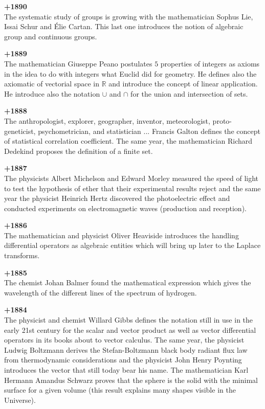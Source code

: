 \textbf{+1890}\\
The systematic study of groups is growing with the mathematician Sophus Lie, Issai Schur and Élie Cartan. This last one introduces the notion of algebraic group and continuous groups. 

\textbf{+1889}\\
The mathematician Giuseppe Peano postulates $5$ properties of integers as axioms in the idea to do with integers what Euclid did for geometry. He defines also the axiomatic of vectorial space in $\mathbb{R}$ and introduce the concept of linear application. He introduce also the notation $\cup$ and $\cap$ for the union and intersection of sets.

\textbf{+1888}\\
The anthropologist, explorer, geographer, inventor, meteorologist, proto-geneticist, psychometrician, and statistician ... Francis Galton defines the concept of statistical correlation coefficient. The same year, the mathematician Richard Dedekind proposes the definition of a finite set. 

\textbf{+1887}\\
The physicists Albert Michelson and Edward Morley measured the speed of light to test the hypothesis of ether that their experimental results reject and the same year the physicist Heinrich Hertz discovered the photoelectric effect and conducted experiments on electromagnetic waves (production and reception).

\textbf{+1886}\\
The mathematician and physicist Oliver Heaviside introduces the handling differential operators as algebraic entities which will bring up later to the Laplace transforms.

\textbf{+1885}\\
The chemist Johan Balmer found the mathematical expression which gives the wavelength of the different lines of the spectrum of hydrogen.

\textbf{+1884}\\
The physicist and chemist Willard Gibbs defines the notation still in use in the early 21st century for the scalar and vector product as well as vector differential operators in its books about to vector calculus. The same year, the physicist Ludwig Boltzmann derives the Stefan-Boltzmann black body radiant flux law from thermodynamic considerations and the physicist John Henry Poynting introduces the vector that still today bear his name. The mathematician Karl Hermann Amandus Schwarz proves that the sphere is the solid with the minimal surface for a given volume (this result explains many shapes visible in the Universe).

